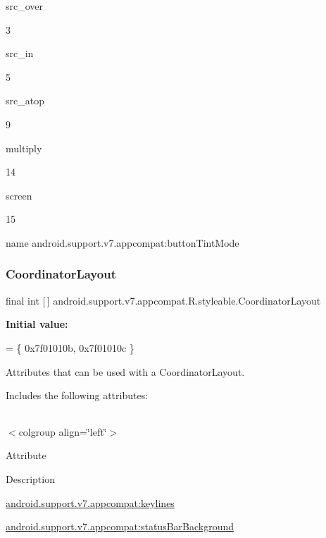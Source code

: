 {\ttfamily src\+\_\+over}

3

{\ttfamily src\+\_\+in}

5

{\ttfamily src\+\_\+atop}

9

{\ttfamily multiply}

14

{\ttfamily screen}

15

name android.\+support.\+v7.\+appcompat\+:button\+Tint\+Mode \mbox{\label{classandroid_1_1support_1_1v7_1_1appcompat_1_1R_1_1styleable_a36909bd71e5ee18cc73ff4732b601a79}} 
\subsubsection{\texorpdfstring{Coordinator\+Layout}{CoordinatorLayout}}
{\footnotesize\ttfamily final int \mbox{[}$\,$\mbox{]} android.\+support.\+v7.\+appcompat.\+R.\+styleable.\+Coordinator\+Layout\hspace{0.3cm}{\ttfamily [static]}}

{\bfseries Initial value\+:}
\begin{DoxyCode}
= \{
            0x7f01010b, 0x7f01010c
        \}
\end{DoxyCode}
Attributes that can be used with a Coordinator\+Layout. 

Includes the following attributes\+:

\tabulinesep=1mm
\begin{longtabu} spread 0pt [c]{*{0}{|X[-1]}|}
\hline
\end{longtabu}
$<$colgroup align=\char`\"{}left\char`\"{}$>$ 

Attribute

Description 

{\ttfamily \hyperlink{classandroid_1_1support_1_1v7_1_1appcompat_1_1R_1_1styleable_ade8ef8741049ad76bd5e90b20b187b41}{android.\+support.\+v7.\+appcompat\+:keylines}}

{\ttfamily \hyperlink{classandroid_1_1support_1_1v7_1_1appcompat_1_1R_1_1styleable_a3cac0ac0b4683f1615bfd53649866096}{android.\+support.\+v7.\+appcompat\+:status\+Bar\+Background}}

